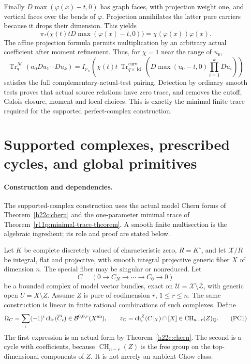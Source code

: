 \documentclass[11pt,a4paper]{article}
\theoremstyle{definition}
\theoremstyle{remark}
\newcommand{\Tr}{\operatorname{Tr}}
\newcommand{\Id}{\operatorname{id}}
\begin{document}
Finally $D\max(\varphi(x)-t,0)$ has graph faces, with projection
weight one, and vertical faces over the bends of $\varphi$. Projection
annihilates the latter pure carriers because it drops their dimension.
This yields
\[
 \pi_*\bigl(\chi(t)tD\max(\varphi(x)-t,0)\bigr)
                         =\chi(\varphi(x))\varphi(x).
\]
The affine projection formula permits multiplication by an arbitrary
actual coefficient after moment refinement. Thus, for
$\chi=1$ near the range of $u_0$,
\[
 \Tr_q^{\mathscr M}(u_0Du_1\cdots Du_k)
  =I_{p_X}\left(\chi(t)t\,
    \Tr_{q\times\Id}^{\mathrm{curv}}
       \left(D\max(u_0-t,0)\prod_{i=1}^kDu_i\right)\right)
\]
satisfies the full complementary-actual-test pairing. Detection by
ordinary smooth tests proves that actual source relations have zero
trace, and removes the cutoff, Galois-closure, moment and local choices.
This is exactly the minimal finite trace required for the supported
perfect-complex construction.



\section{Supported complexes, prescribed cycles, and global primitives}
\label{r11p:supported-complex}

\paragraph*{Construction and dependencies.}
The supported-complex construction uses the actual model Chern forms of
Theorem~\ref{h22c:chern} and the one-parameter minimal trace of
Theorem~\ref{r11p:minimal-trace-theorem}. A smooth finite multisection
is the algebraic ingredient; its role and proof are stated below.

Let $K$ be complete discretely valued of characteristic zero, $R=K^\circ$,
and let $\mathcal X/R$ be integral, flat and projective, with smooth
integral projective generic fiber $X$ of dimension $n$.
The special fiber may be singular or nonreduced.  Let
\[
       C=(0\longrightarrow C_N\longrightarrow\cdots
                             \longrightarrow C_0\longrightarrow0)
\]
be a bounded complex of model vector bundles, exact on
$\mathcal U=\mathcal X\setminus\mathcal Z$, with generic open
$U=X\setminus Z$.  Assume $Z$ is pure of codimension $r$, $1\leq r\leq n$.
The same construction is linear in finite rational combinations of
such complexes.  Define
\[
 \Omega_C=\sum_i(-1)^i\operatorname{ch}_r(\overline C_i)
                              \in\mathcal B^{0,0,r}(X^{\rm an}),
 \qquad
 z_C=\operatorname{ch}^{Z}_r(C|_X)\cap[X]
                              \in\operatorname{CH}_{n-r}(Z)_{\mathbb Q}.
\tag{PC1}\label{r11p:omega-and-cycle}
\]
The first expression is an actual form by Theorem~\ref{h22c:chern}.
The second is a cycle with coefficients, because
$\operatorname{CH}_{n-r}(Z)$ is the free group on the top-dimensional
components of $Z$.  It is not merely an ambient Chow class.
\end{document}
